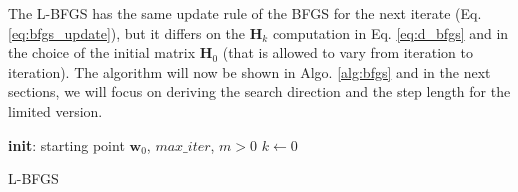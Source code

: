 The L-BFGS has the same update rule of the BFGS for the next iterate (Eq. \ref{eq:bfgs_update}), but it differs on the $\mathbf{H}_k$ computation in Eq. \ref{eq:d_bfgs} and in the choice of the initial matrix $\mathbf{H}_0$ (that is allowed to vary from iteration to iteration). The algorithm will now be shown in Algo. \ref{alg:bfgs} and in the next sections, we will focus on deriving the search direction and the step length for the limited version.

\begin{algorithm}[H]
\label{alg:bfgs}
\SetAlgoLined
 \textbf{init}: starting point $\mathbf{w}_0$, $max\_iter$, $m  > 0$\;
 $k \leftarrow 0$\;
 \caption{L-BFGS}
\end{algorithm}


